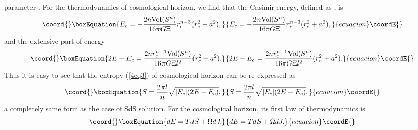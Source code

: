 \documentclass[a4paper,12pt]{article}
\begin{document}
parameter \coordHE{}. For the thermodynamics of cosmological horizon, we find that the
Casimir energy, defined as \coordHE{}, is
\begin{equation}\coord{}\boxEquation{
\label{4eq5} 
E_c=-\frac{2n \mbox{Vol}(S^n)}{16\pi G \Xi}r_c^{n-3}(r_c^2+a^2),
}{
E_c=-\frac{2n \mbox{Vol}(S^n)}{16\pi G \Xi}r_c^{n-3}(r_c^2+a^2),
}{ecuacion}\coordE{}\end{equation}
and the extensive part of energy 
\begin{equation}\coord{}\boxEquation{
2E-E_c=\frac{2n r_c^{n-1}\mbox{Vol}(S^n)}{16\pi G\Xi l^2}(r_c^2+a^2).
}{
2E-E_c=\frac{2n r_c^{n-1}\mbox{Vol}(S^n)}{16\pi G\Xi l^2}(r_c^2+a^2).
}{ecuacion}\coordE{}\end{equation}
Thus it is easy to see that the entropy (\ref{4eq3}) of cosmological horizon can be re-expressed
as 
\begin{equation}\coord{}\boxEquation{
\label{4eq7}
S=\frac{2\pi l}{n}\sqrt{|E_c|(2E-E_c)},
}{
S=\frac{2\pi l}{n}\sqrt{|E_c|(2E-E_c)},
}{ecuacion}\coordE{}\end{equation}
a completely same form as the case of SdS solution.  For the cosmological horizon, its first
law of thermodynamics is
\begin{equation}\coord{}\boxEquation{
\label{4eq8}
dE=TdS +\Omega dJ.
}{
dE=TdS +\Omega dJ.
}{ecuacion}\coordE{}\end{equation}
\end{document}
